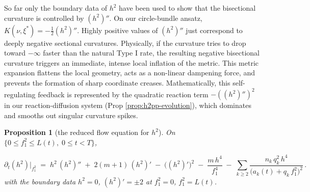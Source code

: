 \documentclass[11pt]{amsart}
\theoremstyle{plain}
\numberwithin{equation}{section}
\newtheorem{proposition}[theorem]{Proposition}
\theoremstyle{definition}
\theoremstyle{remark}
\begin{document}

So far only the boundary data of $h^2$ have been used to show that the bisectional curvature is controlled by $(h^2)''$. On our circle-bundle ansatz, $K(\nu, \xi^*) = -\frac{1}{2}(h^2)''$. Highly positive values of $(h^2)''$ just correspond to deeply negative sectional curvatures. Physically, if the curvature tries to drop toward $-\infty$ faster than the natural Type I rate, the resulting negative bisectional curvature triggers an immediate, intense local inflation of the metric. This metric expansion flattens the local geometry, acts as a non-linear dampening force, and prevents the formation of sharp coordinate creases. Mathematically, this self-regulating feedback is represented by the quadratic reaction term $-((h^2)'')^2$ in our reaction-diffusion system (Prop \ref{prop:h2pp-evolution}), which dominates and smooths out singular curvature spikes.










\begin{proposition}[the reduced flow equation for $h^2$]\label{prop:reduced-flow}
	On $\{ 0 \leq f_1^2 \leq L (t) ,\; 0 \leq t < T \}$,
	
	\begin{equation}\label{eq:reduced-flow}
		\partial_t ( h^2 ) \big|_{f_1^2} \;=\; h^2\, ( h^2 )'' \;+\; 2 ( m + 1 )\, ( h^2 )' \;-\; \big( ( h^2 )' \big)^2 \;-\; \frac{m\, h^4}{f_1^4} \;-\; \sum_{k \geq 2} \frac{n_k\, q_k^2\, h^4}{\big( a_k (t) + q_k\, f_1^2 \big)^2} \,.
	\end{equation}
	with the boundary data $h^2 = 0$, $( h^2 )' = \pm 2$ at $f_1^2 = 0$, $f_1^2 = L (t)$.
	 
\end{proposition}
\end{document}
